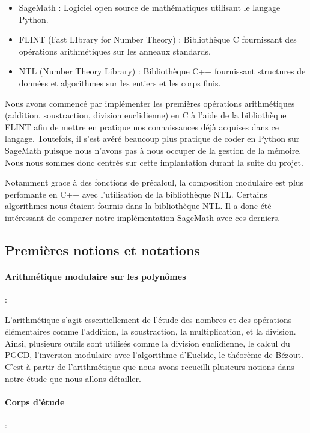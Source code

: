 \documentclass[a4paper]{article}
\begin{document}
\begin{itemize}
    \item SageMath : Logiciel open source de mathématiques utilisant le langage Python.
    \item FLINT (Fast LIbrary for Number Theory) : Bibliothèque C fournissant des opérations arithmétiques sur les anneaux standards.
    \item NTL (Number Theory Library) : Bibliothèque C++ fournissant structures de données et algorithmes sur les entiers et les corps finis.
\end{itemize}

Nous avons commencé par implémenter les premières opérations arithmétiques (addition, soustraction, division euclidienne) en C à l'aide de la bibliothèque FLINT afin de mettre en pratique nos connaissances déjà acquises dans ce langage.
Toutefois, il s'est avéré beaucoup plus pratique de coder en Python sur SageMath puisque nous n'avons pas à nous occuper de la gestion de la mémoire.
Nous nous sommes donc centrés sur cette implantation durant la suite du projet.

Notamment grace à des fonctions de précalcul, la composition modulaire est plus perfomante en C++ avec l'utilisation de la bibliothèque NTL.
Certains algorithmes nous étaient fournis dans la bibliothèque NTL. Il a donc été intéressant de comparer notre implémentation SageMath avec ces derniers.


\subsection{Premières notions et notations}

\paragraph{Arithmétique modulaire sur les polynômes} : 

L'arithmétique s'agit essentiellement de l'étude des nombres et des opérations élémentaires comme l'addition, la soustraction, la multiplication, et la division. 
Ainsi, plusieurs outils sont utilisés comme la division euclidienne, le calcul du PGCD, l'inversion modulaire avec l'algorithme d'Euclide, le théorème de Bézout. C'est à partir de l'arithmétique que nous avons recueilli plusieurs notions dans notre étude que nous allons détailler.

\paragraph{Corps d'étude} :
\end{document}
